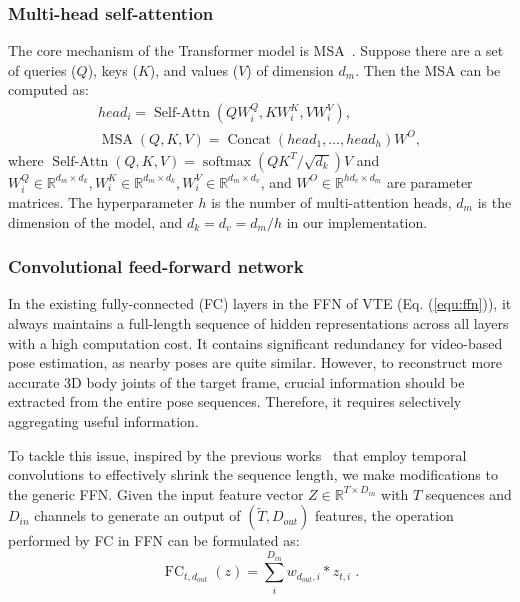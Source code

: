 \documentclass[journal]{IEEEtran}
\begin{document}
\subsubsection{Multi-head self-attention}
The core mechanism of the Transformer model is MSA~\cite{Attention}. 
Suppose there are a set of queries ($Q$), keys ($K$), and values ($V$) of dimension $d_{m}$. 
Then the MSA can be computed as:
\begin{align}
   head_{i}=\operatorname{Self-Attn}\left(Q W_{i}^{Q}, K W_{i}^{K}, V W_{i}^{V}\right), \\
   \operatorname{MSA}(Q, K, V)=\operatorname{Concat}\left(head_{1}, \ldots, head_{h}\right) W^{O},
\end{align}
where $\operatorname{Self-Attn}(Q, K, V)=\operatorname{softmax}\left(Q K^{T} / \sqrt{d_{k}}\right) V$ and $W_{i}^{Q} \in \mathbb{R}^{d_{m} \times d_{k}}, W_{i}^{K} \in \mathbb{R}^{d_{m} \times d_{k}}, W_{i}^{V} \in \mathbb{R}^{d_{m} \times d_{v}}$, and $W^{O} \in \mathbb{R}^{h d_{v} \times d_{m}}$ are parameter matrices. 
The hyperparameter $h$ is the number of multi-attention heads, $d_{m}$ is the dimension of the model, and $d_{k} = d_{v} = d_{m}/h$ in our implementation. 

\subsubsection{Convolutional feed-forward network}
In the existing fully-connected (FC) layers in the FFN of VTE (Eq. (\ref{equ:ffn})), it always maintains a full-length sequence of hidden representations across all layers with a high computation cost. 
It contains significant redundancy for video-based pose estimation, as nearby poses are quite similar. 
However, to reconstruct more accurate 3D body joints of the target frame, crucial information should be extracted from the entire pose sequences. 
Therefore, it requires selectively aggregating useful information. 

To tackle this issue, inspired by the previous works~\cite{pavllo20193d,liu2020attention} that employ temporal convolutions to effectively shrink the sequence length, we make modifications to the generic FFN. 
Given the input feature vector $Z \in \mathbb{R}^{T \times D_{in}}$ with $T$ sequences and $D_{in}$ channels to generate an output of $(\tilde{T}, D_{out})$ features, the operation performed by FC in FFN can be formulated as: 
\begin{equation}
   \operatorname {FC}_{t, d_{out}}(z)= \sum_{i}^{D_{i n}} w_{d_{o u t}, i} * z_{t, i} \; .
   \label{equ:ffn}
\end{equation}
\end{document}
